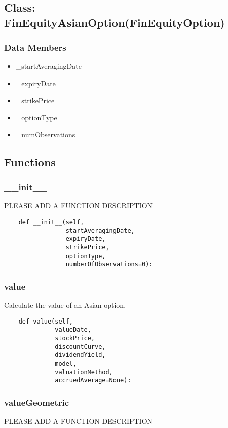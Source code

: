 \documentclass[twoside,11pt]{book}
\begin{document}
\subsection*{Class: FinEquityAsianOption(FinEquityOption)}


\subsubsection*{Data Members}
\begin{itemize}
\item{\_startAveragingDate}
\item{\_expiryDate}
\item{\_strikePrice}
\item{\_optionType}
\item{\_numObservations}
\end{itemize}

\subsection*{Functions}

\subsubsection*{{\bf \_\_init\_\_}}
PLEASE ADD A FUNCTION DESCRIPTION

\begin{lstlisting}
    def __init__(self,
                 startAveragingDate,
                 expiryDate,
                 strikePrice,
                 optionType,
                 numberOfObservations=0):
\end{lstlisting}

\subsubsection*{{\bf value}}
Calculate the value of an Asian option.  

\begin{lstlisting}
    def value(self,
              valueDate,
              stockPrice,
              discountCurve,
              dividendYield,
              model,
              valuationMethod,
              accruedAverage=None):
\end{lstlisting}

\subsubsection*{{\bf valueGeometric}}
PLEASE ADD A FUNCTION DESCRIPTION
\end{document}
